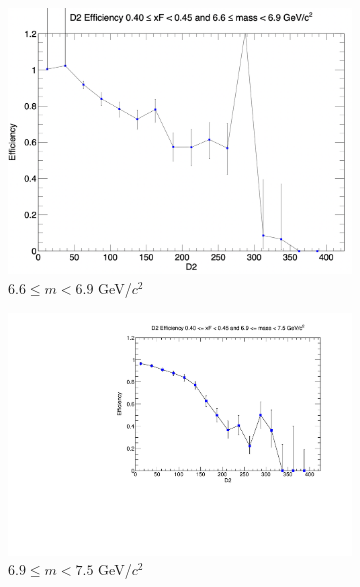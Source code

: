 \documentclass[11pt]{article}
\begin{document}
\begin{figure}[p]
\begin{subfigure}[b]{0.32\textwidth}
        \includegraphics[width=\textwidth]{./kTrackerEfficiencyPlots/D2_Efficiency_xF8_mass8.png}
        \caption{$6.6 \leq m < 6.9$ GeV/$c^2$}
    \end{subfigure}\vspace{0.5cm}
    \begin{subfigure}[b]{0.32\textwidth}
        \centering
        \includegraphics[width=\textwidth]{./kTrackerEfficiencyPlots/D2_Efficiency_xF8_mass9.pdf}
        \caption{$6.9 \leq m < 7.5$ GeV/$c^2$}
    \end{subfigure}\hfill
    \begin{subfigure}[b]{0.32\textwidth}
        \centering

\end{subfigure}
\end{figure}
\end{document}
